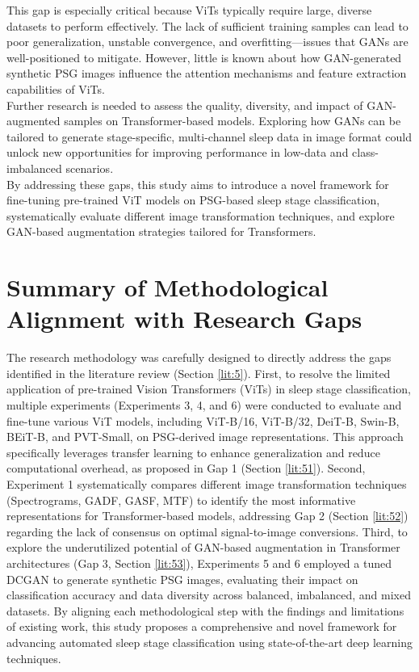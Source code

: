 This gap is especially critical because ViTs typically require large, diverse datasets to perform effectively. The lack of sufficient training samples can lead to poor generalization, unstable convergence, and overfitting—issues that GANs are well-positioned to mitigate. However, little is known about how GAN-generated synthetic PSG images influence the attention mechanisms and feature extraction capabilities of ViTs. \\

Further research is needed to assess the quality, diversity, and impact of GAN-augmented samples on Transformer-based models. Exploring how GANs can be tailored to generate stage-specific, multi-channel sleep data in image format could unlock new opportunities for improving performance in low-data and class-imbalanced scenarios. \\

By addressing these gaps, this study aims to introduce a novel framework for fine-tuning pre-trained ViT models on PSG-based sleep stage classification, systematically evaluate different image transformation techniques, and explore GAN-based augmentation strategies tailored for Transformers.

\section{Summary of Methodological Alignment with Research Gaps}

The research methodology was carefully designed to directly address the gaps identified in the literature review (Section \ref{lit:5}). First, to resolve the limited application of pre-trained Vision Transformers (ViTs) in sleep stage classification, multiple experiments (Experiments 3, 4, and 6) were conducted to evaluate and fine-tune various ViT models, including ViT-B/16, ViT-B/32, DeiT-B, Swin-B, BEiT-B, and PVT-Small, on PSG-derived image representations. This approach specifically leverages transfer learning to enhance generalization and reduce computational overhead, as proposed in Gap 1 (Section \ref{lit:51}). Second, Experiment 1 systematically compares different image transformation techniques (Spectrograms, GADF, GASF, MTF) to identify the most informative representations for Transformer-based models, addressing Gap 2 (Section \ref{lit:52}) regarding the lack of consensus on optimal signal-to-image conversions. Third, to explore the underutilized potential of GAN-based augmentation in Transformer architectures (Gap 3, Section \ref{lit:53}), Experiments 5 and 6 employed a tuned DCGAN to generate synthetic PSG images, evaluating their impact on classification accuracy and data diversity across balanced, imbalanced, and mixed datasets. By aligning each methodological step with the findings and limitations of existing work, this study proposes a comprehensive and novel framework for advancing automated sleep stage classification using state-of-the-art deep learning techniques.